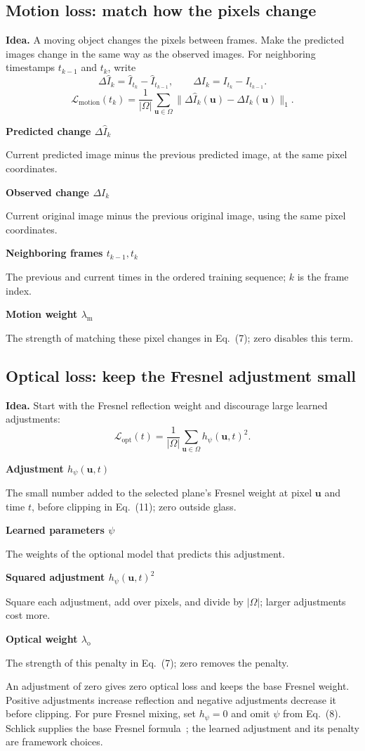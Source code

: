 \documentclass[10pt,a4paper]{article}
\newcommand{\notation}[2]{\noindent\textbf{#1}\par\nopagebreak #2\par}
\newcommand{\uu}{\mathbf u}
\newcommand{\Om}{\Omega}
\newcommand{\notepair}[4]{\par\noindent
\begin{minipage}[t]{0.485\textwidth}\small\notation{#1}{#2}\end{minipage}\hfill
\begin{minipage}[t]{0.485\textwidth}\small\notation{#3}{#4}\end{minipage}\par\vspace{1pt}}
\begin{document}
\subsection*{Motion loss: match how the pixels change}
\textbf{Idea.} A moving object changes the pixels between frames. Make the predicted images change in the same way as the observed images. For neighboring timestamps $t_{k-1}$ and $t_k$, write
\begin{equation}
\Delta\hat I_k=\hat I_{t_k}-\hat I_{t_{k-1}},\qquad
\Delta I_k=I_{t_k}-I_{t_{k-1}}.
\tag{7a}\label{eq:pixelchange}
\end{equation}
\begin{equation}
\boxed{\mathcal L_{\mathrm{motion}}(t_k)=\frac{1}{|\Om|}
\sum_{\uu\in\Om}
\bigl\|\Delta\hat I_k(\uu)-\Delta I_k(\uu)\bigr\|_1.}
\tag{7b}\label{eq:motion}
\end{equation}
\notepair{Predicted change $\Delta\hat I_k$}{Current predicted image minus the previous predicted image, at the same pixel coordinates.}
{Observed change $\Delta I_k$}{Current original image minus the previous original image, using the same pixel coordinates.}
\notepair{Neighboring frames $t_{k-1},t_k$}{The previous and current times in the ordered training sequence; $k$ is the frame index.}
{Motion weight $\lambda_{\mathrm m}$}{The strength of matching these pixel changes in Eq.~(7); zero disables this term.}


\subsection*{Optical loss: keep the Fresnel adjustment small}
\textbf{Idea.} Start with the Fresnel reflection weight and discourage large learned adjustments:
\begin{equation}
\boxed{\mathcal L_{\mathrm{opt}}(t)=\frac{1}{|\Om|}
\sum_{\uu\in\Om}h_\psi(\uu,t)^2.}
\tag{7c}\label{eq:opt}
\end{equation}
\notepair{Adjustment $h_\psi(\uu,t)$}{The small number added to the selected plane's Fresnel weight at pixel $\uu$ and time $t$, before clipping in Eq.~(11); zero outside glass.}
{Learned parameters $\psi$}{The weights of the optional model that predicts this adjustment.}
\notepair{Squared adjustment $h_\psi(\uu,t)^2$}{Square each adjustment, add over pixels, and divide by $|\Om|$; larger adjustments cost more.}
{Optical weight $\lambda_{\mathrm o}$}{The strength of this penalty in Eq.~(7); zero removes the penalty.}
An adjustment of zero gives zero optical loss and keeps the base Fresnel weight. Positive adjustments increase reflection and negative adjustments decrease it before clipping. For pure Fresnel mixing, set $h_\psi=0$ and omit $\psi$ from Eq.~(8). Schlick supplies the base Fresnel formula~\cite{schlick1994}; the learned adjustment and its penalty are framework choices.
\end{document}
